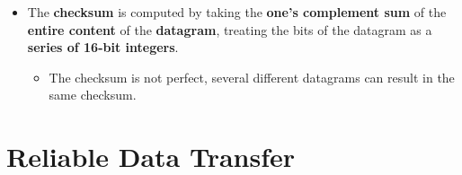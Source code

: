 \documentclass[16pt]{article}
\begin{document}
\begin{itemize}
\begin{enumerate}
        \end{enumerate} 
        \item The \textbf{checksum} is computed by taking the \textbf{one's complement sum} of the \textbf{entire content} of the \textbf{datagram}, treating the bits of the datagram as a \textbf{series of 16-bit integers}.
        \begin{itemize}
            \item The checksum is not perfect, several different datagrams can result in the same checksum.
        \end{itemize}
    \end{itemize}

    \section*{Reliable Data Transfer}
\end{document}
